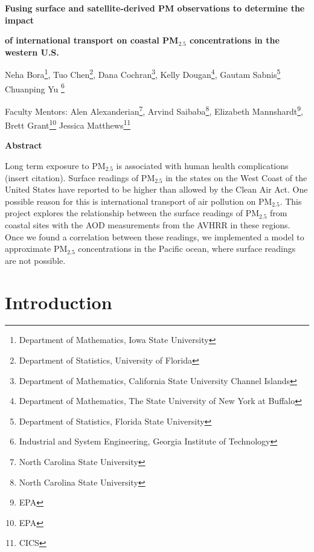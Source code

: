 \documentclass[10pt]{article}
\begin{document}
\centerline{\large \bf Fusing surface and satellite-derived PM observations to determine the impact } 

\centerline{\large \bf of international transport on coastal PM$_{2.5}$ concentrations in the western U.S.}

\vspace{.1truein}

\def\thefootnote{\arabic{footnote}}
\begin{center}
  Neha Bora\footnote{Department of Mathematics, Iowa State University},
  Tuo Chen\footnote{Department of Statistics, University of Florida},
  Dana Cochran\footnote{Department of Mathematics, California State University Channel Islands},
  Kelly Dougan\footnote{Department of Mathematics, The State University of New York at Buffalo},
  Gautam Sabnis\footnote{Department of Statistics, Florida State University}
  Chuanping Yu \footnote{Industrial and System Engineering, Georgia Institute of Technology}
\end{center}


\begin{center}
Faculty Mentors: Alen Alexanderian\footnote{North Carolina State University},
Arvind Saibaba\footnote{North Carolina State University},
Elizabeth Mannshardt\footnote{EPA}, 
Brett Grant\footnote{EPA}
Jessica Matthews\footnote{CICS}
\end{center}


\vspace{.3truein}
\centerline{\bf Abstract}

Long term exposure to PM$_{2.5}$ is associated with human health complications (insert citation). Surface readings of PM$_{2.5}$ in the states on the West Coast of the United States have reported to be higher than allowed by the Clean Air Act. One possible reason for this is international transport of air pollution on PM$_{2.5}$. This project explores the relationship between the surface readings of PM$_{2.5}$ from coastal sites with the AOD measurements from the AVHRR in these regions. Once we found a correlation between these readings, we implemented a model to approximate PM$_{2.5}$ concentrations in the Pacific ocean, where surface readings are not possible.

\section{Introduction}
\end{document}
